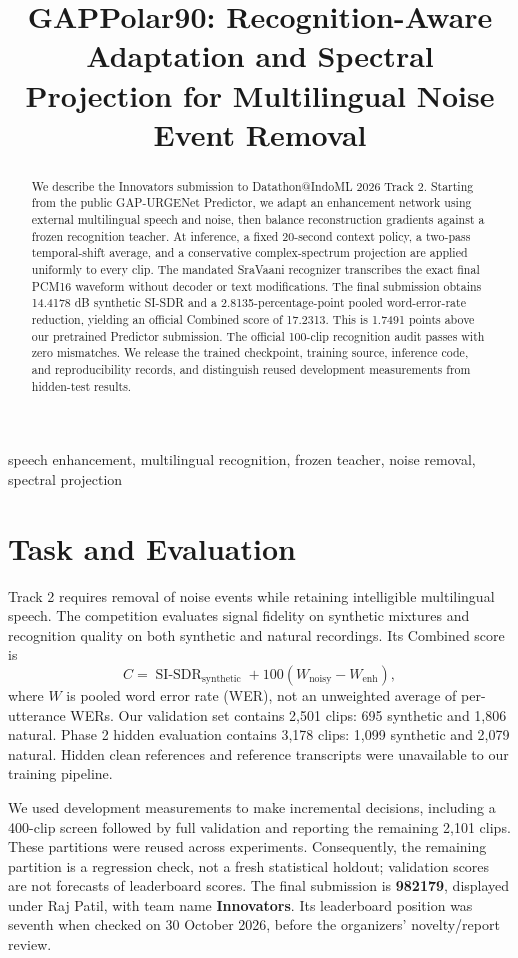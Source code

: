 \documentclass[conference]{IEEEtran}
\title{GAPPolar90: Recognition-Aware Adaptation and Spectral Projection for Multilingual Noise Event Removal}
\author{\IEEEauthorblockN{Raj Patil}\IEEEauthorblockA{Team Innovators (solo participant)\\Datathon@IndoML 2026, Track 2: Removal}}
\begin{document}
\maketitle
\begin{abstract}
We describe the Innovators submission to Datathon@IndoML 2026 Track 2. Starting from the public GAP-URGENet Predictor, we adapt an enhancement network using external multilingual speech and noise, then balance reconstruction gradients against a frozen recognition teacher. At inference, a fixed 20-second context policy, a two-pass temporal-shift average, and a conservative complex-spectrum projection are applied uniformly to every clip. The mandated SraVaani recognizer transcribes the exact final PCM16 waveform without decoder or text modifications. The final submission obtains 14.4178 dB synthetic SI-SDR and a 2.8135-percentage-point pooled word-error-rate reduction, yielding an official Combined score of 17.2313. This is 1.7491 points above our pretrained Predictor submission. The official 100-clip recognition audit passes with zero mismatches. We release the trained checkpoint, training source, inference code, and reproducibility records, and distinguish reused development measurements from hidden-test results.
\end{abstract}
\begin{IEEEkeywords}
speech enhancement, multilingual recognition, frozen teacher, noise removal, spectral projection
\end{IEEEkeywords}

\section{Task and Evaluation}
Track 2 requires removal of noise events while retaining intelligible multilingual speech. The competition evaluates signal fidelity on synthetic mixtures and recognition quality on both synthetic and natural recordings. Its Combined score is
\begin{equation}
C=\operatorname{SI\text{-}SDR}_{\mathrm{synthetic}}+100(W_{\mathrm{noisy}}-W_{\mathrm{enh}}),
\end{equation}
where $W$ is pooled word error rate (WER), not an unweighted average of per-utterance WERs. Our validation set contains 2,501 clips: 695 synthetic and 1,806 natural. Phase 2 hidden evaluation contains 3,178 clips: 1,099 synthetic and 2,079 natural. Hidden clean references and reference transcripts were unavailable to our training pipeline.

We used development measurements to make incremental decisions, including a 400-clip screen followed by full validation and reporting the remaining 2,101 clips. These partitions were reused across experiments. Consequently, the remaining partition is a regression check, not a fresh statistical holdout; validation scores are not forecasts of leaderboard scores. The final submission is \textbf{982179}, displayed under Raj Patil, with team name \textbf{Innovators}. Its leaderboard position was seventh when checked on 30 October 2026, before the organizers' novelty/report review.
\end{document}
